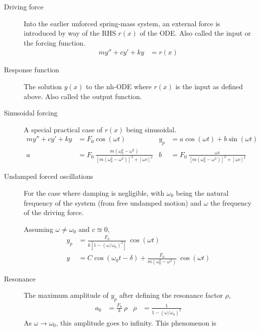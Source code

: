 \begin{description}
    \item[Driving force] Into the earlier unforced spring-mass system, an external force is
        introduced by way of the RHS $ r(x) $ of the ODE. Also called the input or the forcing
        function.
        \begin{align}
            my'' + cy' + ky & = r(x)
        \end{align}
    \item[Response function] The solution $ y(x) $ to the nh-ODE where $ r(x) $ is the
        input as defined above. Also called the output function.
    \item[Sinusoidal forcing] A special practical case of $ r(x) $ being sinusoidal.
        \begin{align}
            my'' + cy' + ky & = F_{0}\cos(\omega t)
                            & y_{p}
                            & = a\cos(\omega t) + b\sin(\omega t)                                                                   \\
            a               & = F_{0}\ \frac{m(\omega_{0}^{2} - \omega^{2})}{[m(\omega_{0}^{2} - \omega^{2})]^{2} + [\omega c]^{2}}
                            & b
                            & = F_{0}\ \frac{\omega c}{[m(\omega_{0}^{2} - \omega^{2})]^{2} + [\omega c]^{2}}
        \end{align}
    \item[Undamped forced oscillations] For the case where damping is negligible, with $ \omega_{0} $
        being the natural frequency of the system (from free undamped motion) and $ \omega $ the
        frequency of the driving force. \par
        Assuming $ \omega \neq \omega_{0} $ and $ c  \approxeq 0 $,
        \begin{align}
            y_{p} & =\frac{F_{0}}{k[1 - (\omega / \omega_{0})^{2}]} \ \cos(\omega t)                              \\
            y     & = C \cos(\omega_{0}t - \delta) + \frac{F_{0}}{m(\omega_{0}^{2} - \omega^{2})}\ \cos(\omega t)
        \end{align}
    \item[Resonance] The maximum amplitude of $ y_{p} $ after defining the resonance factor $ \rho $,
        \begin{align}
            a_{0} & = \frac{F_{0}}{k}\ \rho & \rho & = \frac{1}{1 - (\omega/\omega_{0})^{2}}
        \end{align}
        As $ \omega \to \omega_{0} $, this amplitude goes to infinity. This phenomenon is

\end{description}
